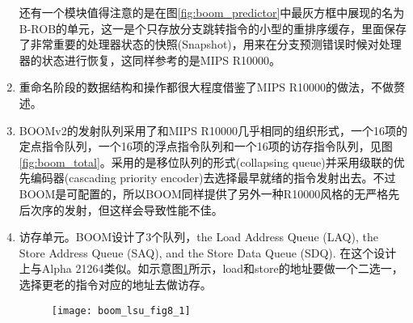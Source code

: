 \begin{enumerate}[label=(\alph*)]
	还有一个模块值得注意的是在图\ref{fig:boom_predictor}中最灰方框中展现的名为B-ROB的单元，这一是个只存放分支跳转指令的小型的重排序缓存，里面保存了非常重要的处理器状态的快照(Snapshot)，用来在分支预测错误时候对处理器的状态进行恢复，这同样参考的是MIPS R10000。
	\item 重命名阶段的数据结构和操作都很大程度借鉴了MIPS R10000的做法，不做赘述。
	\item BOOMv2的发射队列采用了和MIPS R10000几乎相同的组织形式，一个16项的定点指令队列，一个16项的浮点指令队列和一个16项的访存指令队列，见图\ref{fig:boom_total}。采用的是移位队列的形式(collapsing queue)并采用级联的优先编码器(cascading priority encoder)去选择最早就绪的指令发射出去\citep{Celio:EECS-2017-157}。不过BOOM是可配置的，所以BOOM同样提供了另外一种R10000风格的无严格先后次序的发射，但这样会导致性能不佳。
	\item 访存单元。BOOM设计了3个队列，the Load Address Queue (LAQ), the Store Address Queue (SAQ), and the Store Data Queue (SDQ)\citep{BOOMDoc2018}. 在这个设计上与Alpha 21264类似。如示意图\ref{fig:LSU}所示，load和store的地址要做一个二选一，选择更老的指令对应的地址去做访存。
	\begin{figure}[!htbp]
		\centering
		\texttt{[image: boom\_lsu\_fig8\_1]}
		\label{fig:LSU}
	\end{figure}
\end{enumerate}



